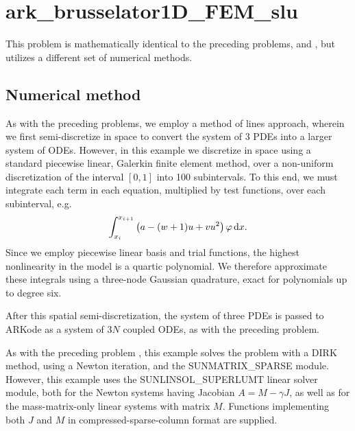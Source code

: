 \documentclass[letterpaper,10pt,english]{sphinxmanual}
\begin{document}
\section{ark\_brusselator1D\_FEM\_slu}
\label{c_serial:id20}\label{c_serial:ark-brusselator1d-fem-slu}
This problem is mathematically identical to the preceding problems,
{\hyperref[c_serial:ark-brusselator1d]{\emph{}}} and {\hyperref[c_serial:ark-brusselator1d-klu]{\emph{}}}, but
utilizes a different set of numerical methods.


\subsection{Numerical method}
\label{c_serial:id21}
As with the preceding problems, we employ a method of lines approach,
wherein we first semi-discretize in space to convert the system of 3
PDEs into a larger system of ODEs.  However, in this example we
discretize in space using a standard piecewise linear, Galerkin finite
element method, over a non-uniform discretization of the interval
\([0,1]\) into 100 subintervals.  To this end, we must integrate
each term in each equation, multiplied by test functions, over each
subinterval, e.g.
\begin{gather}
\begin{split}\int_{x_i}^{x_{i+1}} \left(a - (w+1) u + v u^2\right) \varphi\,\mathrm dx.\end{split}\notag
\end{gather}
Since we employ piecewise linear basis and trial functions, the
highest nonlinearity in the model is a quartic polynomial.  We
therefore approximate these integrals using a three-node Gaussian
quadrature, exact for polynomials up to degree six.

After this spatial semi-discretization, the system of three PDEs is
passed to ARKode as a system of \(3N\) coupled ODEs, as with the
preceding problem.

As with the preceding problem {\hyperref[c_serial:ark-brusselator1d-klu]{\emph{}}}, this
example solves the problem with a DIRK method, using a Newton
iteration, and the SUNMATRIX\_SPARSE module.  However, this example
uses the SUNLINSOL\_SUPERLUMT linear solver module, both for the Newton
systems having Jacobian \(A=M-\gamma J\), as well as for the
mass-matrix-only linear systems with matrix \(M\).  Functions
implementing both \(J\) and \(M\) in compressed-sparse-column
format are supplied.
\end{document}
